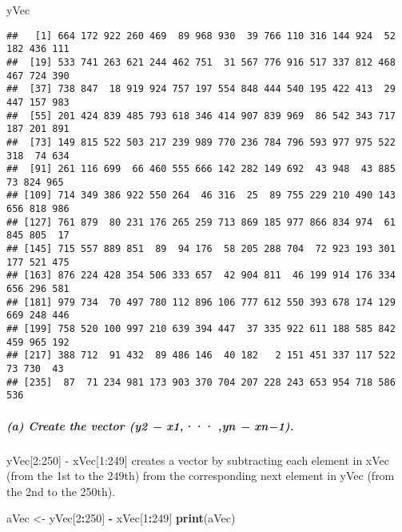 \documentclass[
]{article}
\newenvironment{Shaded}{\begin{snugshade}}{\end{snugshade}}
\newcommand{\DecValTok}[1]{\textcolor[rgb]{0.00,0.00,0.81}{#1}}
\newcommand{\FunctionTok}[1]{\textcolor[rgb]{0.13,0.29,0.53}{\textbf{#1}}}
\newcommand{\NormalTok}[1]{#1}
\newcommand{\OtherTok}[1]{\textcolor[rgb]{0.56,0.35,0.01}{#1}}
\newcommand{\SpecialCharTok}[1]{\textcolor[rgb]{0.81,0.36,0.00}{\textbf{#1}}}
\begin{document}
\begin{Shaded}
\begin{Highlighting}[]
\NormalTok{ yVec}
\end{Highlighting}
\end{Shaded}

\begin{verbatim}
##   [1] 664 172 922 260 469  89 968 930  39 766 110 316 144 924  52 182 436 111
##  [19] 533 741 263 621 244 462 751  31 567 776 916 517 337 812 468 467 724 390
##  [37] 738 847  18 919 924 757 197 554 848 444 540 195 422 413  29 447 157 983
##  [55] 201 424 839 485 793 618 346 414 907 839 969  86 542 343 717 187 201 891
##  [73] 149 815 522 503 217 239 989 770 236 784 796 593 977 975 522 318  74 634
##  [91] 261 116 699  66 460 555 666 142 282 149 692  43 948  43 885  73 824 965
## [109] 714 349 386 922 550 264  46 316  25  89 755 229 210 490 143 656 818 986
## [127] 761 879  80 231 176 265 259 713 869 185 977 866 834 974  61 845 805  17
## [145] 715 557 889 851  89  94 176  58 205 288 704  72 923 193 301 177 521 475
## [163] 876 224 428 354 506 333 657  42 904 811  46 199 914 176 334 656 296 581
## [181] 979 734  70 497 780 112 896 106 777 612 550 393 678 174 129 669 248 446
## [199] 758 520 100 997 210 639 394 447  37 335 922 611 188 585 842 459 965 192
## [217] 388 712  91 432  89 486 146  40 182   2 151 451 337 117 522  73 730  43
## [235]  87  71 234 981 173 903 370 704 207 228 243 653 954 718 586 536
\end{verbatim}

\subparagraph{(a) Create the vector (y2 − x1,··· ,yn −
xn−1).}\label{a-create-the-vector-y2-x1-yn-xn1.}

yVec{[}2:250{]} - xVec{[}1:249{]} creates a vector by subtracting each
element in xVec (from the 1st to the 249th) from the corresponding next
element in yVec (from the 2nd to the 250th).

\begin{Shaded}
\begin{Highlighting}[]
\NormalTok{aVec }\OtherTok{\textless{}{-}}\NormalTok{ yVec[}\DecValTok{2}\SpecialCharTok{:}\DecValTok{250}\NormalTok{] }\SpecialCharTok{{-}}\NormalTok{ xVec[}\DecValTok{1}\SpecialCharTok{:}\DecValTok{249}\NormalTok{]}
\FunctionTok{print}\NormalTok{(aVec)}
\end{Highlighting}
\end{Shaded}
\end{document}
